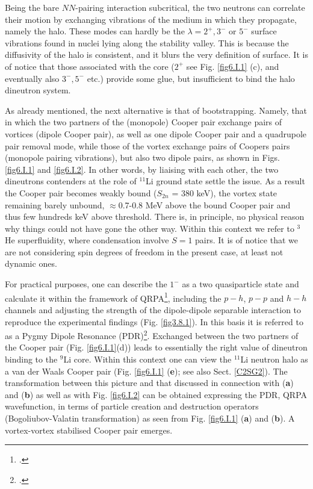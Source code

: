 \begin{subappendices}
Being the bare $NN$-pairing interaction subcritical, the two neutrons can correlate their motion by exchanging vibrations of the medium in which they propagate, namely  the halo.  These modes can hardly  be the $\lambda= 2^+,3^-$ or $5^-$ surface vibrations found in nuclei lying along the  stability valley. This is because the diffusivity of the halo is consistent, and it blurs the very definition of surface. It is of notice that those associated with  the core ($ 2^+$ see Fig. \ref{fig6.I.1} (c), and eventually also $3^-,5^-$ etc.) provide some glue, but insufficient to bind  the  halo dineutron system.

As already mentioned, the next alternative is that of bootstrapping. Namely, that in which the two partners of the  (monopole) Cooper pair exchange  pairs of vortices 
(dipole Cooper pair),  as well as one dipole Cooper pair and a quadrupole pair removal mode,
while those of the vortex exchange  pairs of Coopers pairs (monopole pairing vibrations), but also two dipole pairs, as shown in Figs. \ref{fig6.I.1} and \ref{fig6.I.2}.  In other words, by  liaising  with each other,  
the two dineutrons contenders at the role of $^{11}$Li ground state  settle the issue.  As a result  the Cooper pair becomes weakly bound ($S_{2n}$ = 380 keV), the vortex state remaining barely unbound, $\approx$0.7-0.8 MeV above the bound Cooper pair and thus few hundreds keV above threshold.
There is, in principle, no physical reason why things could not have gone  the other way. Within this context we refer to $^3$He superfluidity, where condensation involve $S=1$ pairs. It is of notice that we are not considering spin degrees of freedom in  the present case,
at least  not dynamic ones. 

For practical purposes, one can describe the  $1^-$ as a two quasiparticle state and calculate it within  the framework of QRPA\footnote{\cite{Broglia:19}.},  including the $p-h$, $p-p$ and $h-h$ channels and adjusting the strength of the dipole-dipole separable interaction to reproduce the  experimental findings (Fig. \ref{fig3.8.1}). In this basis it is referred to  as a Pygmy Dipole  Resonance (PDR)\footnote{\cite{Barranco:01,Broglia:19c}.}. Exchanged between the  two partners of the Cooper pair (Fig. \ref{fig6.I.1}(d)) leads to essentially the right value of  dineutron binding  to the $^9$Li core. Within this context  one can view the
$^{11}$Li neutron halo as a van der Waals Cooper pair (Fig. \ref{fig6.I.1} (\textbf{e}); see also Sect. \ref{C2SG2}). The transformation between this picture and  that discussed in connection with 
(\textbf{a}) and (\textbf{b}) as well as with Fig. \ref{fig6.I.2} can be obtained  expressing the PDR, QRPA wavefunction, in terms of particle  creation and destruction operators (Bogoliubov-Valatin transformation) as seen from Fig. \ref{fig6.I.1} (\textbf{a}) and (\textbf{b}). 
A vortex-vortex  stabilised Cooper pair emerges. 


\end{subappendices}
